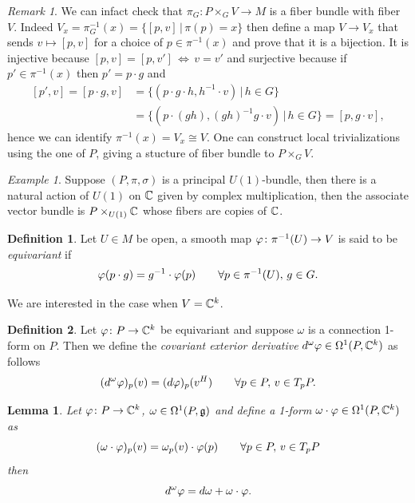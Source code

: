 \documentclass{article}
\newtheorem{lemma}{Lemma}
\theoremstyle{definition}
\newtheorem{defi}{Definition}
\theoremstyle{remark}
\newtheorem{rmk}{Remark}
\newtheorem{ex}{Example}
\begin{document}
\begin{rmk}
    We can infact check that \(\pi_G\colon P\times_G V\to M\) is a fiber bundle with fiber \(V\). Indeed \(V_x=\pi_G^{-1}(x)=\{[p,v]\, |\, \pi(p)=x\}\) then define a map \(V\to V_x\) that sends \(v\mapsto [p,v]\) for a choice of \(p\in\pi^{-1}(x)\) and prove that it is a bijection. It is injective because \([p,v]=[p,v']\,\iff\, v=v'\) and surjective because if \(p'\in\pi^{-1}(x)\) then \(p'=p\cdot g\) and
    \[\begin{split}
        [p',v]=[p\cdot g,v] & =\{(p\cdot g\cdot h,h^{-1}\cdot v)\,|\, h\in G\} \\
        & =\{(p\cdot (gh),(gh)^{-1}g\cdot v)\,|\,h\in G\}=[p,g\cdot v],
    \end{split}\]
    hence we can identify \(\pi^{-1}(x)=V_x\cong V\).
    One can construct local trivializations using the one of \(P\), giving a stucture of fiber bundle to \(P\times_G V\).
\end{rmk}

\begin{ex}
    Suppose \((P,\pi,\sigma)\) is a principal \(U(1)\)-bundle, then there is a natural action of \(U(1)\) on \(\mathbb{C}\) given by complex multiplication, then the associate vector bundle is \(P\times_{U(1)}\mathbb{C}\) whose fibers are copies of \(\mathbb{C}\).
\end{ex}

\begin{defi}
    Let \(U\in M\) be open, a smooth map \(\varphi\colon \pi^{-1}(U)\to V\) is said to be \emph{equivariant} if
    \[\varphi(p\cdot g)=g^{-1}\cdot \varphi(p) \qquad \forall p\in\pi^{-1}(U),\, g\in G.\]
\end{defi}

We are interested in the case when \(V=\mathbb{C}^k\).

\begin{defi}
    Let \(\varphi\colon P\to \mathbb{C}^k\) be equivariant and suppose \(\omega\) is a connection 1-form on \(P\). Then we define the \emph{covariant exterior derivative} \(d^\omega\varphi\in\Omega^1(P,\mathbb{C}^k)\) as follows
    \[(d^\omega \varphi)_p(v)=(d\varphi)_p(v^H)\qquad \forall p\in P,\, v\in T_pP.\]
\end{defi}

\begin{lemma}
    Let \(\varphi\colon P\to \mathbb{C}^k\), \(\omega\in\Omega^1(P,\mathfrak{g})\) and define a 1-form \(\omega\cdot\varphi\in \Omega^1(P,\mathbb{C}^k)\) as
    \[(\omega\cdot\varphi)_p(v)=\omega_p(v)\cdot\varphi(p)\qquad\forall p\in P,\, v\in T_pP\]
    then
    \[d^\omega\varphi=d\omega+\omega\cdot\varphi.\]
\end{lemma}
\end{document}
